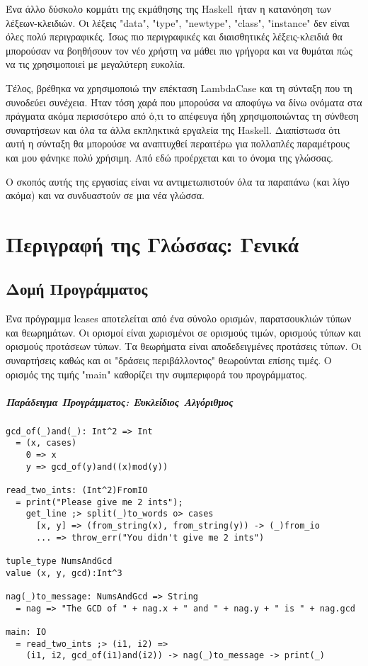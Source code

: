 \documentclass[diploma]{softlab-thesis}
\def\H{Haskell}
\begin{document}
Ένα άλλο δύσκολο κομμάτι της εκμάθησης της \H\ ήταν η κατανόηση των
λέξεων-κλειδιών. Οι λέξεις "data", "type", "newtype", "class", "instance" δεν
είναι όλες πολύ περιγραφικές. Ίσως πιο περιγραφικές και διαισθητικές
λέξεις-κλειδιά θα μπορούσαν να βοηθήσουν τον νέο χρήστη να μάθει
πιο γρήγορα και να θυμάται πώς να τις χρησιμοποιεί με μεγαλύτερη ευκολία.

Τέλος, βρέθηκα να χρησιμοποιώ την επέκταση LambdaCase και τη σύνταξη που τη
συνοδεύει συνέχεια. Ήταν τόση χαρά που μπορούσα να αποφύγω να δίνω
ονόματα στα πράγματα ακόμα περισσότερο από ό,τι το απέφευγα ήδη
χρησιμοποιώντας τη σύνθεση συναρτήσεων και όλα τα άλλα εκπληκτικά
εργαλεία της \H. Διαπίστωσα ότι
αυτή η σύνταξη θα μπορούσε να αναπτυχθεί περαιτέρω για πολλαπλές
παραμέτρους και μου φάνηκε πολύ χρήσιμη. Από εδώ προέρχεται και το
όνομα της γλώσσας.

Ο σκοπός αυτής της εργασίας είναι να αντιμετωπιστούν όλα τα παραπάνω
(και λίγο ακόμα) και να συνδυαστούν σε μια νέα γλώσσα.

\chapter{Περιγραφή της Γλώσσας: Γενικά}

\section{Δομή Προγράμματος}

Ένα πρόγραμμα lcases αποτελείται από ένα σύνολο ορισμών, παρατσουκλιών τύπων
και θεωρημάτων. Οι ορισμοί είναι χωρισμένοι σε ορισμούς τιμών, ορισμούς τύπων
και ορισμούς προτάσεων τύπων. Τα θεωρήματα είναι αποδεδειγμένες προτάσεις
τύπων. Οι συναρτήσεις καθώς και οι "δράσεις περιβάλλοντος" θεωρούνται επίσης
τιμές.  Ο ορισμός της τιμής "main" καθορίζει την συμπεριφορά του προγράμματος.

\paragraph{Παράδειγμα Προγράμματος: Ευκλείδιος Αλγόριθμος}
\begin{verbatim}
gcd_of(_)and(_): Int^2 => Int
  = (x, cases)
    0 => x
    y => gcd_of(y)and((x)mod(y))

read_two_ints: (Int^2)FromIO
  = print("Please give me 2 ints");
    get_line ;> split(_)to_words o> cases
      [x, y] => (from_string(x), from_string(y)) -> (_)from_io
      ... => throw_err("You didn't give me 2 ints")

tuple_type NumsAndGcd
value (x, y, gcd):Int^3

nag(_)to_message: NumsAndGcd => String
  = nag => "The GCD of " + nag.x + " and " + nag.y + " is " + nag.gcd

main: IO
  = read_two_ints ;> (i1, i2) =>
    (i1, i2, gcd_of(i1)and(i2)) -> nag(_)to_message -> print(_)
\end{verbatim}
\end{document}
